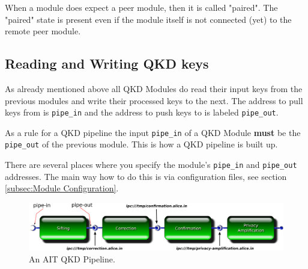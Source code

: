 \medskip

When a module does expect a peer module, then it is called "paired". The "paired" state is present even if the module itself is not connected (yet) to the remote peer module.

\subsection{Reading and Writing QKD keys}
\label{subsec:Reading and Writing QKD keys}

As already mentioned above all QKD Modules do read their input keys from the previous modules and write their processed keys to the next. The address to pull keys from is \texttt{pipe\_in} and the address to push keys to is labeled  \texttt{pipe\_out}.

\medskip

As a rule for a QKD pipeline the input \texttt{pipe\_in} of a QKD Module \textbf{must} be the \texttt{pipe\_out} of the previous module. This is how a QKD pipeline is built up.

\vspace{2cm}

\begin{center}
\begin{minipage}{10cm}
\end{minipage}    
\end{center}

\vspace{2cm}

\clearpage

There are several places where you specify the module's \texttt{pipe\_in} and \texttt{pipe\_out} addresses. The main way how to do this is via configuration files, see section \ref{subsec:Module Configuration}.

\medskip

\begin{figure}[h]
    \centering
    \includegraphics[scale=0.50,keepaspectratio=true]{./gfx/qkd-pipeline.png}
    \caption{An AIT QKD Pipeline.}
    \label{fig:qkd-pipeline}
\end{figure}


